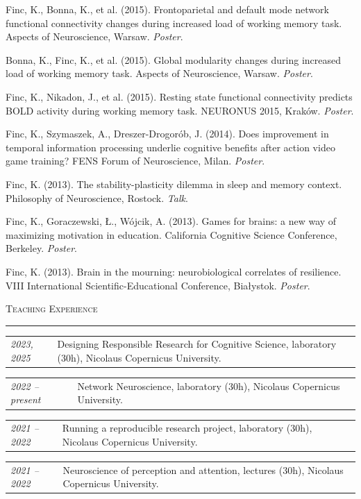 \documentclass[10pt, a4paper]{article}
\makeatletter
\newcommand{\cvsection}[1]{%
  \vspace{1.4em}%
  {\large\scshape #1}%
  \vspace{0.25em}%
  \par\noindent\textcolor{rule}{\rule{\linewidth}{0.4pt}}%
  \vspace{0.5em}%
}
\newcommand{\cventry}[2]{%
  \begin{tabular*}{\linewidth}{@{}p{2.8cm}@{\hspace{0.5em}}p{\dimexpr\linewidth-3.3cm}@{}}
    \textcolor{accent}{\small\itshape #1} & #2 \\[0.2em]
  \end{tabular*}%
}
\newenvironment{cvlist}{%
  \begin{enumerate}[leftmargin=2em, label={[\arabic*]}, itemsep=0.25em, parsep=0pt]%
}{%
  \end{enumerate}%
}
\makeatother
\begin{document}
\begin{cvlist}
\item Finc, K., Bonna, K., et al. (2015). Frontoparietal and default mode network functional connectivity changes during increased load of working memory task. Aspects of Neuroscience, Warsaw. \textit{Poster}.

\item Bonna, K., Finc, K., et al. (2015). Global modularity changes during increased load of working memory task. Aspects of Neuroscience, Warsaw. \textit{Poster}.

\item Finc, K., Nikadon, J., et al. (2015). Resting state functional connectivity predicts BOLD activity during working memory task. NEURONUS 2015, Krak\'ow. \textit{Poster}.

\item Finc, K., Szymaszek, A., Dreszer-Drogor\'ob, J. (2014). Does improvement in temporal information processing underlie cognitive benefits after action video game training? FENS Forum of Neuroscience, Milan. \textit{Poster}.

\item Finc, K. (2013). The stability-plasticity dilemma in sleep and memory context. Philosophy of Neuroscience, Rostock. \textit{Talk}.

\item Finc, K., Goraczewski, {\L}., W\'ojcik, A. (2013). Games for brains: a new way of maximizing motivation in education. California Cognitive Science Conference, Berkeley. \textit{Poster}.

\item Finc, K. (2013). Brain in the mourning: neurobiological correlates of resilience. VIII International Scientific-Educational Conference, Bia{\l}ystok. \textit{Poster}.

\end{cvlist}

\cvsection{Teaching Experience}

\cventry{2023, 2025}{Designing Responsible Research for Cognitive Science, laboratory (30h), Nicolaus Copernicus University.}

\cventry{2022 -- present}{Network Neuroscience, laboratory (30h), Nicolaus Copernicus University.}

\cventry{2021 -- 2022}{Running a reproducible research project, laboratory (30h), Nicolaus Copernicus University.}

\cventry{2021 -- 2022}{Neuroscience of perception and attention, lectures (30h), Nicolaus Copernicus University.}
\end{document}
